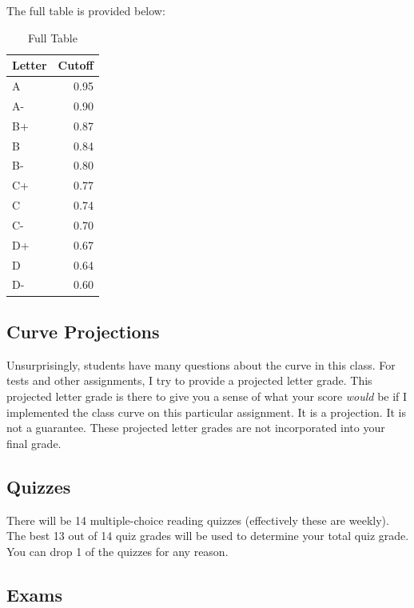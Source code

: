 \documentclass[
]{book}
\begin{document}
The full table is provided below:

\begin{table}

\caption{\label{tab:unnamed-chunk-5}Full Table}
\centering
\begin{tabular}[t]{l|r}
\hline
Letter & Cutoff\\
\hline
A & 0.95\\
\hline
A- & 0.90\\
\hline
B+ & 0.87\\
\hline
B & 0.84\\
\hline
B- & 0.80\\
\hline
C+ & 0.77\\
\hline
C & 0.74\\
\hline
C- & 0.70\\
\hline
D+ & 0.67\\
\hline
D & 0.64\\
\hline
D- & 0.60\\
\hline
\end{tabular}
\end{table}

\subsection*{Curve Projections}\label{curve-projections}


Unsurprisingly, students have many questions about the curve in this class. For tests and other assignments, I try to provide a projected letter grade.
This projected letter grade is there to give you a sense of what your score \emph{would} be if I implemented the class curve on this particular assignment.
It is a projection. It is not a guarantee. These projected letter grades are not incorporated into your final grade.

\subsection*{Quizzes}\label{quizzes}


There will be 14 multiple-choice reading quizzes (effectively these are weekly). The best 13 out of 14 quiz grades will be used to determine your total quiz grade. You can drop 1 of the quizzes for any reason.

\subsection*{Exams}\label{exams}
\end{document}
